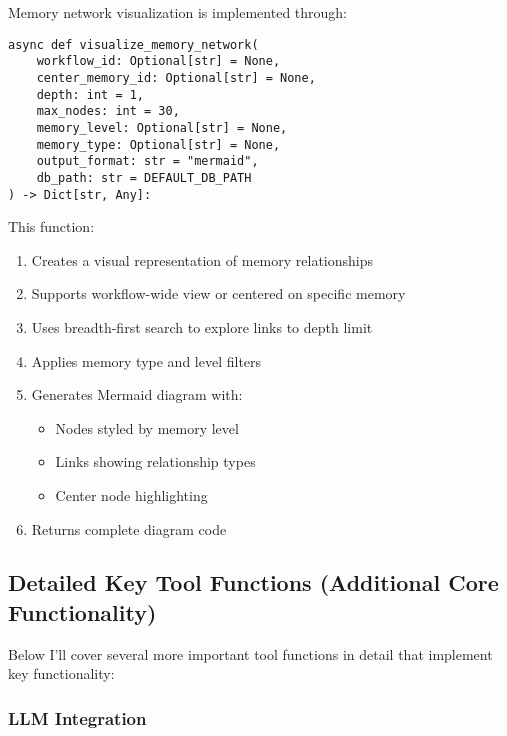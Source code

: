 \documentclass[12pt,a4paper]{article}
\begin{document}
Memory network visualization is implemented through:
\begin{pageablecode}
\begin{verbatim}
async def visualize_memory_network(
    workflow_id: Optional[str] = None,
    center_memory_id: Optional[str] = None,
    depth: int = 1,
    max_nodes: int = 30,
    memory_level: Optional[str] = None,
    memory_type: Optional[str] = None,
    output_format: str = "mermaid",
    db_path: str = DEFAULT_DB_PATH
) -> Dict[str, Any]:
\end{verbatim}
\end{pageablecode}
This function:
\begin{enumerate}[label=\arabic*.]
    \item Creates a visual representation of memory relationships
    \item Supports workflow-wide view or centered on specific memory
    \item Uses breadth-first search to explore links to depth limit
    \item Applies memory type and level filters
    \item Generates Mermaid diagram with:
    \begin{itemize}
        \item Nodes styled by memory level
        \item Links showing relationship types
        \item Center node highlighting
    \end{itemize}
    \item Returns complete diagram code
\end{enumerate}

\subsection*{Detailed Key Tool Functions (Additional Core Functionality)}

Below I'll cover several more important tool functions in detail that implement key functionality:

\subsubsection*{LLM Integration}
\end{document}
